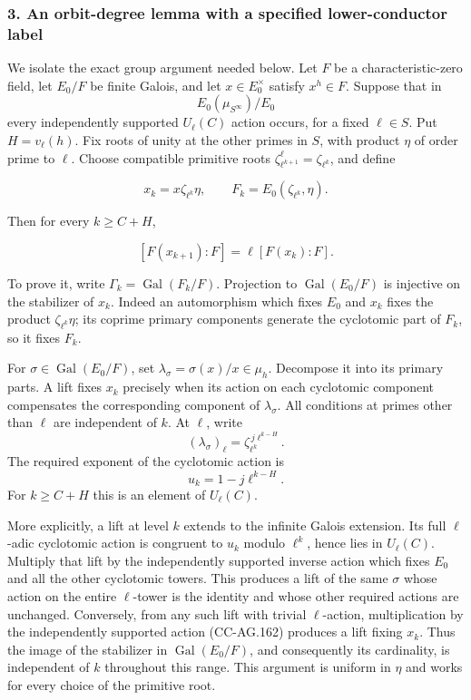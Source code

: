 \subsubsection{3. An orbit-degree lemma with a specified lower-conductor
label}\label{an-orbit-degree-lemma-with-a-specified-lower-conductor-label}

We isolate the exact group argument needed below. Let \(F\) be a
characteristic-zero field, let \(E_0/F\) be finite Galois, and let
\(x\in E_0^\times\) satisfy \(x^h\in F\). Suppose that in \[
                         E_0(\mu_{S^\infty})/E_0
\] every independently supported \(U_\ell(C)\) action occurs, for a
fixed \(\ell\in S\). Put \(H=v_\ell(h)\). Fix roots of unity at the
other primes in \(S\), with product \(\eta\) of order prime to \(\ell\).
Choose compatible primitive roots
\(\zeta_{\ell^{k+1}}^\ell=\zeta_{\ell^k}\), and define

\[
 x_k=x\zeta_{\ell^k}\eta,\qquad
 F_k=E_0(\zeta_{\ell^k},\eta).
 \tag{CC-AG.160}
\]

Then for every \(k\ge C+H\),

\[
 [F(x_{k+1}):F]=\ell[F(x_k):F].
 \tag{CC-AG.161}
\]

To prove it, write \(\Gamma_k=\operatorname{Gal}(F_k/F)\). Projection to
\(\operatorname{Gal}(E_0/F)\) is injective on the stabilizer of \(x_k\).
Indeed an automorphism which fixes \(E_0\) and \(x_k\) fixes the product
\(\zeta_{\ell^k}\eta\); its coprime primary components generate the
cyclotomic part of \(F_k\), so it fixes \(F_k\).

For \(\sigma\in\operatorname{Gal}(E_0/F)\), set
\(\lambda_\sigma=\sigma(x)/x\in\mu_h\). Decompose it into its primary
parts. A lift fixes \(x_k\) precisely when its action on each cyclotomic
component compensates the corresponding component of \(\lambda_\sigma\).
All conditions at primes other than \(\ell\) are independent of \(k\).
At \(\ell\), write \[
 (\lambda_\sigma)_\ell
        =\zeta_{\ell^k}^{\,j\ell^{k-H}}.
\] The required exponent of the cyclotomic action is \[
                       u_k=1-j\ell^{k-H}.
 \tag{CC-AG.162}
\] For \(k\ge C+H\) this is an element of \(U_\ell(C)\).

More explicitly, a lift at level \(k\) extends to the infinite Galois
extension. Its full \(\ell\)-adic cyclotomic action is congruent to
\(u_k\) modulo \(\ell^k\), hence lies in \(U_\ell(C)\). Multiply that
lift by the independently supported inverse action which fixes \(E_0\)
and all the other cyclotomic towers. This produces a lift of the same
\(\sigma\) whose action on the entire \(\ell\)-tower is the identity and
whose other required actions are unchanged. Conversely, from any such
lift with trivial \(\ell\)-action, multiplication by the independently
supported action (CC-AG.162) produces a lift fixing \(x_k\). Thus the
image of the stabilizer in \(\operatorname{Gal}(E_0/F)\), and
consequently its cardinality, is independent of \(k\) throughout this
range. This argument is uniform in \(\eta\) and works for every choice
of the primitive root.

